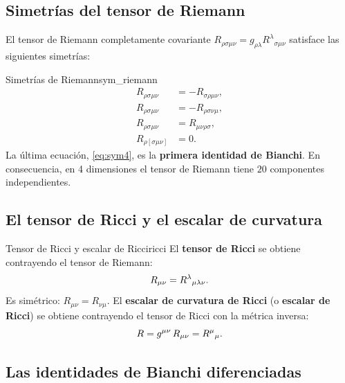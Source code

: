\subsection{Simetrías del tensor de Riemann}

El tensor de Riemann completamente covariante $R_{\rho\sigma\mu\nu} = g_{\rho\lambda}R^\lambda{}_{\sigma\mu\nu}$ satisface las siguientes simetrías:

\begin{proposicion}{Simetrías de Riemann}{sym_riemann}
\begin{align}
  R_{\rho\sigma\mu\nu} &= -R_{\sigma\rho\mu\nu}, \label{eq:sym1}\\
  R_{\rho\sigma\mu\nu} &= -R_{\rho\sigma\nu\mu}, \label{eq:sym2}\\
  R_{\rho\sigma\mu\nu} &= R_{\mu\nu\rho\sigma}, \label{eq:sym3}\\
  R_{\rho[\sigma\mu\nu]} &= 0. \label{eq:sym4}
\end{align}
La última ecuación, \eqref{eq:sym4}, es la \textbf{primera identidad de Bianchi}. En consecuencia, en 4 dimensiones el tensor de Riemann tiene $20$ componentes independientes.
\end{proposicion}

\subsection{El tensor de Ricci y el escalar de curvatura}

\begin{definicion}{Tensor de Ricci y escalar de Ricci}{ricci}
El \textbf{tensor de Ricci} se obtiene contrayendo el tensor de Riemann:
\begin{equation}
  R_{\mu\nu} = R^\lambda{}_{\mu\lambda\nu}.
  \label{eq:ricci}
\end{equation}
Es simétrico: $R_{\mu\nu} = R_{\nu\mu}$. El \textbf{escalar de curvatura de Ricci} (o \textbf{escalar de Ricci}) se obtiene contrayendo el tensor de Ricci con la métrica inversa:
\begin{equation}
  R = g^{\mu\nu}\, R_{\mu\nu} = R^\mu{}_\mu.
  \label{eq:ricci_scalar}
\end{equation}
\end{definicion}

\subsection{Las identidades de Bianchi diferenciadas}

